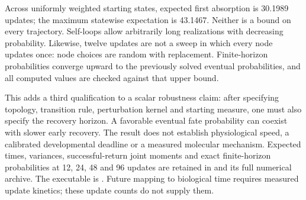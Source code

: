 Across uniformly weighted starting states, expected first absorption is 30.1989 updates; the maximum statewise expectation is 43.1467. Neither is a bound on every trajectory. Self-loops allow arbitrarily long realizations with decreasing probability. Likewise, twelve updates are not a sweep in which every node updates once: node choices are random with replacement. Finite-horizon probabilities converge upward to the previously solved eventual probabilities, and all computed values are checked against that upper bound.

This adds a third qualification to a scalar robustness claim: after specifying topology, transition rule, perturbation kernel and starting measure, one must also specify the recovery horizon. A favorable eventual fate probability can coexist with slower early recovery. The result does not establish physiological speed, a calibrated developmental deadline or a measured molecular mechanism. Expected times, variances, successful-return joint moments and exact finite-horizon probabilities at 12, 24, 48 and 96 updates are retained in  and its full numerical archive. The executable is . Future mapping to biological time requires measured update kinetics; these update counts do not supply them.
